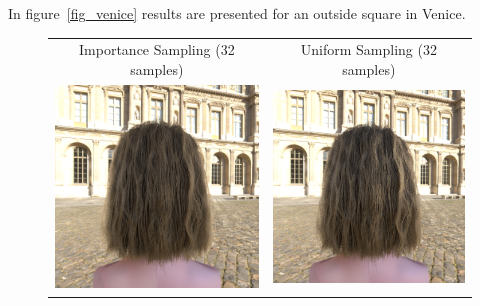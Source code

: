\documentclass[11pt,a4paper]{report}
\begin{document}
%
%

In figure~\ref{fig_venice} results are presented for an outside square in Venice.

\begin{figure}[h]
\begin{center}
\begin{tabular}{cc}
Importance Sampling (32 samples) & Uniform Sampling (32 samples) \\
\includegraphics[scale=0.16]{realworld/venice/deon_blonde1_32.png} &
\includegraphics[scale=0.16]{realworld/venice/uniform_blonde1_32.png} \\

\end{tabular}
\end{center}
\end{figure}
\end{document}

